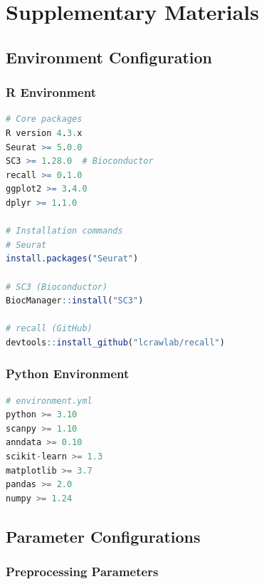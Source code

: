 
\section{Supplementary Materials}
\label{sec:appendix}

\subsection{Environment Configuration}

\subsubsection{R Environment}

\begin{lstlisting}[language=R, caption={R package versions used in this study}]
# Core packages
R version 4.3.x
Seurat >= 5.0.0
SC3 >= 1.28.0  # Bioconductor
recall >= 0.1.0
ggplot2 >= 3.4.0
dplyr >= 1.1.0

# Installation commands
# Seurat
install.packages("Seurat")

# SC3 (Bioconductor)
BiocManager::install("SC3")

# recall (GitHub)
devtools::install_github("lcrawlab/recall")
\end{lstlisting}

\subsubsection{Python Environment}

\begin{lstlisting}[language=Python, caption={Python package versions for complementary analysis}]
# environment.yml
python >= 3.10
scanpy >= 1.10
anndata >= 0.10
scikit-learn >= 1.3
matplotlib >= 3.7
pandas >= 2.0
numpy >= 1.24
\end{lstlisting}

\subsection{Parameter Configurations}

\subsubsection{Preprocessing Parameters}

